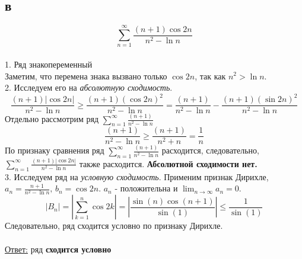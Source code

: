 \documentclass[a5paper, 10pt]{article}
\theoremstyle{definition}
\theoremstyle{plain}
\theoremstyle{remark}
\begin{document}
\subsection{в}
\begin{equation}
\sum \limits_{n = 1}^{\infty} \frac{\left(n+1\right) \cos 2n}{n^2-\ln n}
\end{equation}
\\
1. Ряд знакопеременный\\
Заметим, что перемена знака вызвано только $\cos 2n$, так как $n^2 > \ln n$.\\
2. Исследуем его на \textit{абсолютную сходимость}. \\
\begin{equation}
\frac{\left(n+1\right) \left| \cos 2n \right|}{n^2-\ln n} \geq \frac{\left(n+1\right) \left( \cos 2n \right)^2}{n^2-\ln n}=
\frac{\left(n+1\right)}{n^2-\ln n} - \frac{\left(n+1\right) \left( \sin 2n \right)^2}{n^2-\ln n}
\end{equation}
Отдельно рассмотрим ряд $\sum \limits_{n = 1}^{\infty} \frac{\left(n+1\right)}{n^2-\ln n}$
\begin{equation}
\frac{\left(n+1\right)}{n^2-\ln n} \geq \frac{\left(n+1\right)}{n^2+ n}=  \frac{1}{n}
\end{equation}
По признаку сравнения ряд $\sum \limits_{n = 1}^{\infty} \frac{\left(n+1\right)}{n^2-\ln n}$ расходится, следовательно, $\sum \limits_{n = 1}^{\infty} \frac{\left(n+1\right) \left| \cos 2n \right|}{n^2-\ln n}$ также расходится. \textbf{Абсолютной сходимости нет.}\\
3. Исследуем ряд на \textit{условную сходимость}.
Применим признак Дирихле, $a_n = \frac{n+1}{n^2 - \ln n}, \, b_n = \cos 2n$. $a_n$ - положительна и $\lim_{n \to \infty} a_n = 0$.
\begin{equation}
\left| B_n \right| = \left| \sum \limits_{k = 1}^{n}\cos 2k\right| = \left| \frac{\sin(n)\cos(n+1)}{\sin(1)} \right|  \leq \frac{1}{\sin(1)}
\end{equation}
Следовательно, ряд сходится условно по признаку Дирихле.
\\\\
\underline{Ответ:} ряд  \textbf{сходится условно}


\newpage
\end{document}
